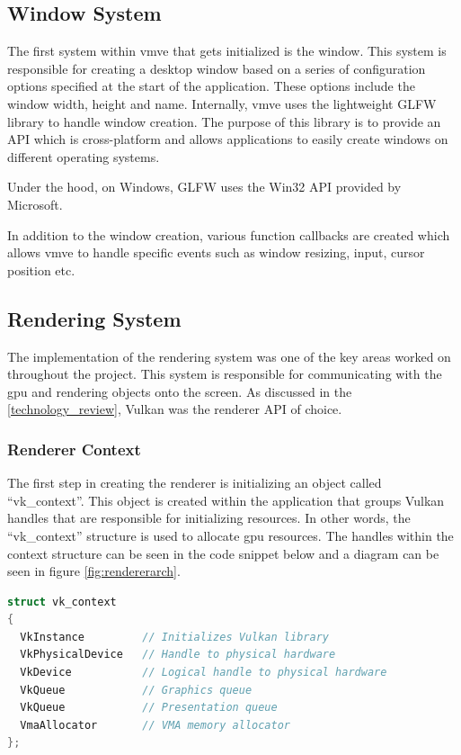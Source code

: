 \documentclass[11pt]{article}
\begin{document}
  

\subsection{Window System}
The first system within \gls*{vmve} that gets initialized is the window. This system is
responsible for creating a desktop window based on a series of configuration
options specified at the start of the application. These options include the
window width, height and name. Internally, \gls*{vmve} uses the lightweight GLFW
library to handle window creation. The purpose of this library is to provide an
API which is cross-platform and allows applications to easily create windows on
different operating systems. 

Under the hood, on Windows, GLFW uses the Win32 API provided by Microsoft.

In addition to the window creation, various function callbacks are created
which allows \gls*{vmve} to handle specific events such as window resizing, input,
cursor position etc.

\subsection{Rendering System}
The implementation of the rendering system was one of the key areas worked on
throughout the project. This system is responsible for communicating with the
\gls*{gpu} and rendering objects onto the screen. As discussed in the
\ref{technology_review}, Vulkan was the renderer API of choice. 

    

\subsubsection{Renderer Context}
The first step in creating the renderer is initializing an object called
``vk\_context''. This object is created within the application that groups Vulkan
handles that are responsible for initializing resources. In other words, the
``vk\_context'' structure is used to allocate \gls*{gpu} resources. The handles
within the context structure can be seen in the code snippet below and a diagram
can be seen in figure \ref{fig:rendererarch}.

\begin{lstlisting}[language=C++]
struct vk_context
{
  VkInstance         // Initializes Vulkan library
  VkPhysicalDevice   // Handle to physical hardware
  VkDevice           // Logical handle to physical hardware
  VkQueue            // Graphics queue
  VkQueue            // Presentation queue
  VmaAllocator       // VMA memory allocator
};
\end{lstlisting}
\end{document}
